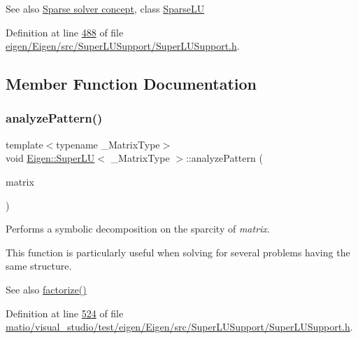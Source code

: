 \begin{DoxySeeAlso}{See also}
\hyperlink{SparseLinearSystems.dox_TutorialSparseSolverConcept}{Sparse solver concept}, class \hyperlink{group___sparse_l_u___module_class_eigen_1_1_sparse_l_u}{Sparse\+LU} 
\end{DoxySeeAlso}


Definition at line \hyperlink{eigen_2_eigen_2src_2_super_l_u_support_2_super_l_u_support_8h_source_l00488}{488} of file \hyperlink{eigen_2_eigen_2src_2_super_l_u_support_2_super_l_u_support_8h_source}{eigen/\+Eigen/src/\+Super\+L\+U\+Support/\+Super\+L\+U\+Support.\+h}.



\subsection{Member Function Documentation}
\mbox{\label{class_eigen_1_1_super_l_u_a493cdfada27415a6037b004ff974eace}} 
\subsubsection{\texorpdfstring{analyze\+Pattern()}{analyzePattern()}\hspace{0.1cm}{\footnotesize\ttfamily [1/2]}}
{\footnotesize\ttfamily template$<$typename \+\_\+\+Matrix\+Type$>$ \\
void \hyperlink{class_eigen_1_1_super_l_u}{Eigen\+::\+Super\+LU}$<$ \+\_\+\+Matrix\+Type $>$\+::analyze\+Pattern (\begin{DoxyParamCaption}\item[{const Matrix\+Type \&}]{matrix }\end{DoxyParamCaption})\hspace{0.3cm}{\ttfamily [inline]}}

Performs a symbolic decomposition on the sparcity of {\itshape matrix}.

This function is particularly useful when solving for several problems having the same structure.

\begin{DoxySeeAlso}{See also}
\hyperlink{class_eigen_1_1_super_l_u_a0b5a5fbda1a1f368003c7c01021a4636}{factorize()} 
\end{DoxySeeAlso}


Definition at line \hyperlink{matio_2visual__studio_2test_2eigen_2_eigen_2src_2_super_l_u_support_2_super_l_u_support_8h_source_l00524}{524} of file \hyperlink{matio_2visual__studio_2test_2eigen_2_eigen_2src_2_super_l_u_support_2_super_l_u_support_8h_source}{matio/visual\+\_\+studio/test/eigen/\+Eigen/src/\+Super\+L\+U\+Support/\+Super\+L\+U\+Support.\+h}.

